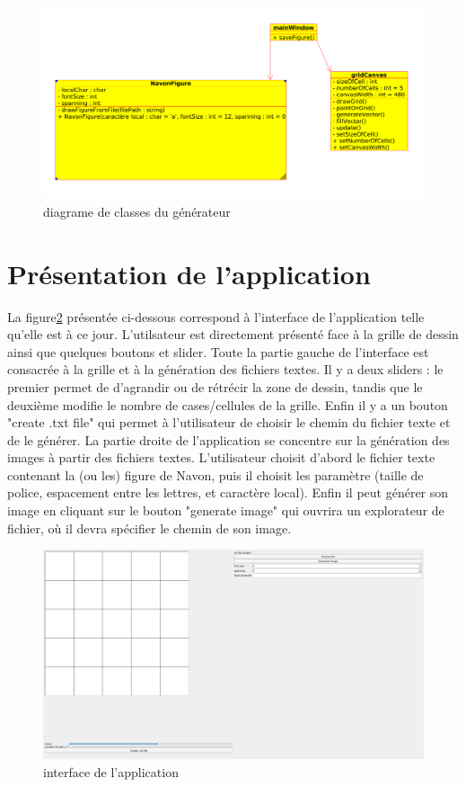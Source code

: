 \documentclass{article}
\begin{document}
	\begin{figure}[!h]
		\centering
		\includegraphics[scale=0.25]{./images/diagramme_classe.png}
		\caption{diagrame de classes du générateur}
		\label{fig:classe_figure}
	\end{figure}

	\section{Présentation de l'application}
	La figure\ref{fig:interface} présentée ci-dessous correspond à l'interface de l'application telle qu'elle est à ce jour. L'utilsateur est directement présenté face à la grille de dessin ainsi que quelques boutons et slider. Toute la partie gauche de l'interface est consacrée à la grille et à la génération des fichiers textes. Il y a deux sliders : le premier permet de d'agrandir ou de rétrécir la zone de dessin, tandis que le deuxième modifie le nombre de cases/cellules de la grille. Enfin il y a un bouton "create .txt file" qui permet à l'utilisateur de choisir le chemin du fichier texte et de le générer. La partie droite de l'application se concentre sur la génération des images à partir des fichiers textes. L'utilisateur choisit d'abord le fichier texte contenant la (ou les) figure de Navon, puis il choisit les paramètre (taille de police, espacement entre les lettres, et caractère local). Enfin il peut générer son image en cliquant sur le bouton "generate image" qui ouvrira un explorateur de fichier, où il devra spécifier le chemin de son image.

	\begin{figure}[!h]
		\centering
		\includegraphics[scale=0.2]{./images/interface.png}
		\caption{interface de l'application}
		\label{fig:interface}
	\end{figure}
\end{document}
